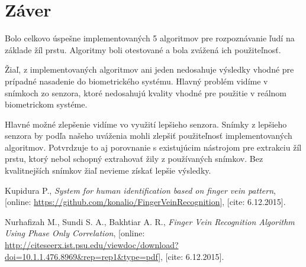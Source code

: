 \documentclass[11pt,a4paper]{article}
\begin{document}
\clearpage
\section{Záver} \label{zaver}

Bolo celkovo úspešne implementovaných 5 algoritmov pre rozpoznávanie ľudí na
základe žíl prstu. Algoritmy boli otestované a bola zvážená ich použiteľnosť.

Žiaľ, z implementovaných algoritmov ani jeden nedosahuje výsledky vhodné pre
prípadné nasadenie do biometrického systému. Hlavný problém vidíme v snímkoch zo
senzora, ktoré nedosahujú kvality vhodné pre použitie v reálnom biometrickom
systéme.

Hlavné možné zlepšenie vidíme vo využití lepšieho senzora. Snímky z lepšieho
senzora by podľa našeho uváženia mohli zlepšiť použiteľnosť implementovaných
algoritmov. Potvrdzuje to aj porovnanie s existujúcim nástrojom pre extrakciu
žíl prstu, ktorý nebol schopný extrahovať žily z používaných snímkov. Bez
kvalitnejších snímkov žiaľ nevieme získať lepšie výsledky.

\clearpage



\begin{thebibliography}{99}

	Kupidura P.,
	\emph{System for human identification based on finger vein pattern},
	[online: \url{https://github.com/konalio/FingerVeinRecognition}],
	[cite: 6.12.2015].

	Nurhafizah M., Sundi S. A., Bakhtiar A. R.,
		\emph{Finger Vein Recognition Algorithm Using Phase Only Correlation},
	[online: \url{http://citeseerx.ist.psu.edu/viewdoc/download?doi=10.1.1.476.8969&rep=rep1&type=pdf}],
	[cite: 6.12.2015].

\end{thebibliography}
\end{document}
